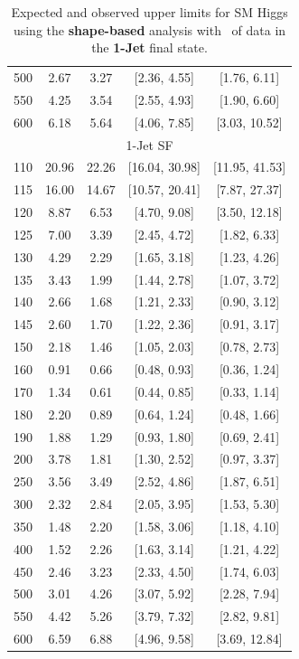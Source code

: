 \begin{table}[hbp!]
\begin{center}
\begin{tabular}{c c c c c  }
500 & 2.67 & 3.27 & [2.36, 4.55] & [1.76, 6.11] \\
550 & 4.25 & 3.54 & [2.55, 4.93] & [1.90, 6.60] \\
600 & 6.18 & 5.64 & [4.06, 7.85] & [3.03, 10.52] \\
\hline
\multicolumn{5}{c}{1-Jet SF} \\
\hline
110 & 20.96 & 22.26 & [16.04, 30.98] & [11.95, 41.53] \\
115 & 16.00 & 14.67 & [10.57, 20.41] & [7.87, 27.37] \\
120 & 8.87 & 6.53 & [4.70, 9.08] & [3.50, 12.18] \\
125 & 7.00 & 3.39 & [2.45, 4.72] & [1.82, 6.33] \\
130 & 4.29 & 2.29 & [1.65, 3.18] & [1.23, 4.26] \\
135 & 3.43 & 1.99 & [1.44, 2.78] & [1.07, 3.72] \\
140 & 2.66 & 1.68 & [1.21, 2.33] & [0.90, 3.12] \\
145 & 2.60 & 1.70 & [1.22, 2.36] & [0.91, 3.17] \\
150 & 2.18 & 1.46 & [1.05, 2.03] & [0.78, 2.73] \\
160 & 0.91 & 0.66 & [0.48, 0.93] & [0.36, 1.24] \\
170 & 1.34 & 0.61 & [0.44, 0.85] & [0.33, 1.14] \\
180 & 2.20 & 0.89 & [0.64, 1.24] & [0.48, 1.66] \\
190 & 1.88 & 1.29 & [0.93, 1.80] & [0.69, 2.41] \\
200 & 3.78 & 1.81 & [1.30, 2.52] & [0.97, 3.37] \\
250 & 3.56 & 3.49 & [2.52, 4.86] & [1.87, 6.51] \\
300 & 2.32 & 2.84 & [2.05, 3.95] & [1.53, 5.30] \\
350 & 1.48 & 2.20 & [1.58, 3.06] & [1.18, 4.10] \\
400 & 1.52 & 2.26 & [1.63, 3.14] & [1.21, 4.22] \\
450 & 2.46 & 3.23 & [2.33, 4.50] & [1.74, 6.03] \\
500 & 3.01 & 4.26 & [3.07, 5.92] & [2.28, 7.94] \\
550 & 4.42 & 5.26 & [3.79, 7.32] & [2.82, 9.81] \\
600 & 6.59 & 6.88 & [4.96, 9.58] & [3.69, 12.84] \\
\hline
\end{tabular}
\caption{Expected and observed upper limits for SM Higgs using the
  {\bf shape-based} analysis with \intlumiEightTeV\ of data in the {\bf 1-Jet} final state.}
\label{tab:shapebase_uls_1j}
\end{center}
\end{table}
